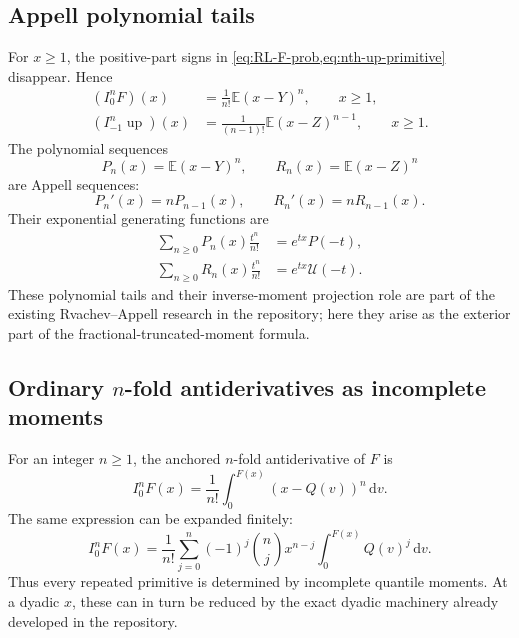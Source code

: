 \documentclass[11pt,oneside]{article}
\theoremstyle{definition}
\newcommand{\F}{F}
\newcommand{\Q}{Q}
\newcommand{\upf}{\operatorname{up}}
\newcommand{\E}{\mathbb E}
\newcommand{\dd}{\,\mathrm d}
\begin{document}
\subsection{Appell polynomial tails}

For \(x\ge1\), the positive-part signs in \cref{eq:RL-F-prob,eq:nth-up-primitive}
disappear.  Hence
\begin{align}
 (I_0^n\F)(x)&=\frac1{n!}\E(x-Y)^n,\qquad x\ge1,
 \label{eq:F-Appell-tail}\\
 (I_{-1}^n\upf)(x)&=\frac1{(n-1)!}\E(x-Z)^{n-1},\qquad x\ge1.
 \label{eq:up-Appell-tail}
\end{align}
The polynomial sequences
\begin{equation}\label{eq:Appell-polynomials}
 P_n(x)=\E(x-Y)^n,
 \qquad R_n(x)=\E(x-Z)^n
\end{equation}
are Appell sequences:
\begin{equation}\label{eq:Appell-derivative}
 P_n'(x)=nP_{n-1}(x),\qquad R_n'(x)=nR_{n-1}(x).
\end{equation}
Their exponential generating functions are
\begin{align}
 \sum_{n\ge0}P_n(x)\frac{t^n}{n!}
 &=e^{tx}P(-t),\label{eq:Pn-egf}\\
 \sum_{n\ge0}R_n(x)\frac{t^n}{n!}
 &=e^{tx}\mathcal U(-t).\label{eq:Rn-egf}
\end{align}
These polynomial tails and their inverse-moment projection role are part of the existing
Rvachev--Appell research in the repository; here they arise as the exterior part of the
fractional-truncated-moment formula.

\subsection{Ordinary \(n\)-fold antiderivatives as incomplete moments}

For an integer \(n\ge1\), the anchored \(n\)-fold antiderivative of \(\F\) is
\begin{equation}\label{eq:nth-F-primitive}
 I_0^n\F(x)=\frac1{n!}
 \int_0^{\F(x)}(x-\Q(v))^n\dd v.
\end{equation}
The same expression can be expanded finitely:
\begin{equation}\label{eq:nth-F-incomplete-moments}
 I_0^n\F(x)
 =\frac1{n!}\sum_{j=0}^n(-1)^j\binom njx^{n-j}
 \int_0^{\F(x)}\Q(v)^j\dd v.
\end{equation}
Thus every repeated primitive is determined by incomplete quantile moments.  At a dyadic
\(x\), these can in turn be reduced by the exact dyadic machinery already developed in
the repository.
\end{document}
